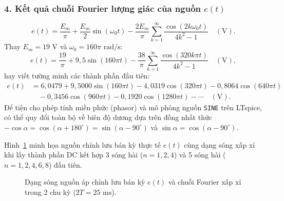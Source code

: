\subsubsection*{4. Kết quả chuỗi Fourier lượng giác của nguồn $e(t)$}
\begin{equation}
    e(t) = \frac{E_m}{\pi} + \frac{E_m}{2}\sin(\omega_0 t)
           - \frac{2E_m}{\pi}\sum_{k=1}^{\infty} \frac{\cos(2k\omega_0 t)}{4k^2 - 1} \quad (\text{V}).
    \label{eq:e_fourier_sym}
\end{equation}
Thay $E_m = 19\text{ V}$ và $\omega_0 = 160\pi\text{ rad/s}$:
\begin{equation}
    e(t) = \frac{19}{\pi} + 9{,}5\sin(160\pi t)
           - \frac{38}{\pi}\sum_{k=1}^{\infty} \frac{\cos(320k\pi t)}{4k^2 - 1} \quad (\text{V}),
\end{equation}
hay viết tường minh các thành phần đầu tiên:
\begin{align}
    e(t) &= 6{,}0479 + 9{,}5000\sin(160\pi t) - 4{,}0319\cos(320\pi t) - 0{,}8064\cos(640\pi t) \nonumber\\
         &\quad - 0{,}3456\cos(960\pi t) - 0{,}1920\cos(1280\pi t) - \cdots \quad (\text{V}).
\end{align}
Để tiện cho phép tính miền phức (phasor) và mô phỏng nguồn \texttt{SINE} trên LTspice, có thể quy đổi toàn bộ về biên độ dương dựa trên đồng nhất thức $-\cos\alpha = \cos(\alpha + 180^\circ) = \sin(\alpha - 90^\circ)$ và $\sin\alpha = \cos(\alpha - 90^\circ)$.

Hình~\ref{fig:source_recon} minh họa nguồn chỉnh lưu bán kỳ thực tế $e(t)$ cùng dạng sóng xấp xỉ khi lấy thành phần DC kết hợp 3 sóng hài ($n=1,2,4$) và 5 sóng hài ($n=1,2,4,6,8$) đầu tiên.

\begin{figure}[!htbp]
    \centering
    \caption{Dạng sóng nguồn áp chỉnh lưu bán kỳ $e(t)$ và chuỗi Fourier xấp xỉ trong 2 chu kỳ ($2T = 25\text{ ms}$).}
    \label{fig:source_recon}
\end{figure}


